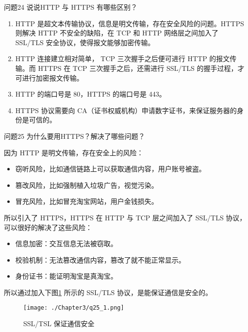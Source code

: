 \documentclass[cn,11pt,color=blue,lang=cn]{elegantbook}
\begin{document}
\begin{custom}{问题24}
说说HTTP 与 HTTPS 有哪些区别？
\end{custom}
\begin{solution}
\begin{enumerate}
	\item HTTP 是超文本传输协议，信息是明文传输，存在安全风险的问题。HTTPS 则解决 HTTP 不安全的缺陷，在 TCP 和 HTTP 网络层之间加入了 SSL/TLS 安全协议，使得报文能够加密传输。
	\item HTTP 连接建立相对简单， TCP 三次握手之后便可进行 HTTP 的报文传输。而 HTTPS 在 TCP 三次握手之后，还需进行 SSL/TLS 的握手过程，才可进行加密报文传输。
	\item HTTP 的端口号是 80，HTTPS 的端口号是 443。
	\item HTTPS 协议需要向 CA（证书权威机构）申请数字证书，来保证服务器的身份是可信的。
\end{enumerate}
\end{solution}

\begin{custom}{问题25}
为什么要用HTTPS？解决了哪些问题？
\end{custom}
\begin{solution}
因为 HTTP 是明文传输，存在安全上的风险：
\begin{itemize}
	\item 窃听风险，比如通信链路上可以获取通信内容，用户账号被盗。
	\item 篡改风险，比如强制植入垃圾广告，视觉污染。
	\item 冒充风险，比如冒充淘宝网站，用户金钱损失。
\end{itemize}

所以引入了 HTTPS，HTTPS 在 HTTP 与 TCP 层之间加入了 SSL/TLS 协议，可以很好的解决了这些风险：
\begin{itemize}
	\item 信息加密：交互信息无法被窃取。
	\item 校验机制：无法篡改通信内容，篡改了就不能正常显示。
	\item 身份证书：能证明淘宝是真淘宝。
\end{itemize}
所以通过加入下图\ref{fig25_1} 所示的 SSL/TLS 协议，是能保证通信是安全的。
\begin{figure}[htbp]
\centering
\texttt{[image: ./Chapter3/q25\_1.png]}
\caption{SSL/TSL 保证通信安全}
\label{fig25_1}
\end{figure}
\end{solution}
\end{document}
